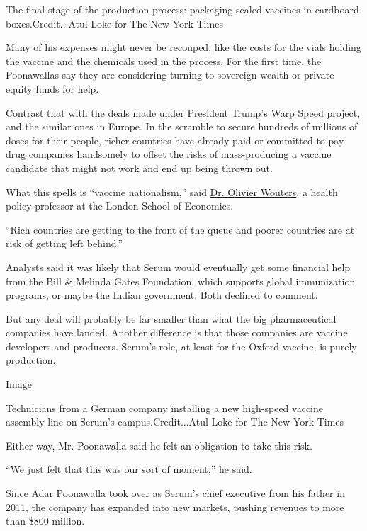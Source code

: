 The final stage of the production process: packaging sealed vaccines in
cardboard boxes.Credit...Atul Loke for The New York Times

Many of his expenses might never be recouped, like the costs for the
vials holding the vaccine and the chemicals used in the process. For the
first time, the Poonawallas say they are considering turning to
sovereign wealth or private equity funds for help.

Contrast that with the deals made under
\href{https://www.nytimes3xbfgragh.onion/2020/06/03/us/politics/coronavirus-vaccine-trump-moderna.html}{President
Trump's Warp Speed project}, and the similar ones in Europe. In the
scramble to secure hundreds of millions of doses for their people,
richer countries have already paid or committed to pay drug companies
handsomely to offset the risks of mass-producing a vaccine candidate
that might not work and end up being thrown out.

What this spells is ``vaccine nationalism,'' said
\href{http://www.lse.ac.uk/health-policy/people/dr-olivier-wouters}{Dr.
Olivier Wouters}, a health policy professor at the London School of
Economics.

``Rich countries are getting to the front of the queue and poorer
countries are at risk of getting left behind.''

Analysts said it was likely that Serum would eventually get some
financial help from the Bill \& Melinda Gates Foundation, which supports
global immunization programs, or maybe the Indian government. Both
declined to comment.

But any deal will probably be far smaller than what the big
pharmaceutical companies have landed. Another difference is that those
companies are vaccine developers and producers. Serum's role, at least
for the Oxford vaccine, is purely production.

Image

Technicians from a German company installing a new high-speed vaccine
assembly line on Serum's campus.Credit...Atul Loke for The New York
Times

Either way, Mr. Poonawalla said he felt an obligation to take this risk.

``We just felt that this was our sort of moment,'' he said.

Since Adar Poonawalla took over as Serum's chief executive from his
father in 2011, the company has expanded into new markets, pushing
revenues to more than \$800 million.

